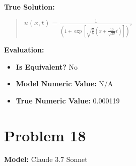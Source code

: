 \documentclass{article}
\begin{document}
\textbf{True Solution:}
\begin{quote}
$u(x,t) = \frac{1}{\left(1 + \exp\left[\sqrt{\frac{5}{6}}\left(x + \frac{10}{\sqrt{30}} t \right)\right] \right)^2}$
\end{quote}

\textbf{Evaluation:}
\begin{itemize}
\item \textbf{Is Equivalent?} No
\item \textbf{Model Numeric Value:} N/A
\item \textbf{True Numeric Value:} 0.000119
\end{itemize}
\vspace{1cm}
\section*{Problem 18}
\textbf{Model:} Claude 3.7 Sonnet
\end{document}
